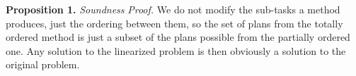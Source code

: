 



\textbf{Proposition 1.} \textit{Soundness}  \newline
\textit{Proof.}
We do not modify the sub-tasks a method produces, just the ordering between them, so the set of plans from the totally ordered method is just a subset of the plans possible from the partially ordered one. Any solution to the linearized problem is then obviously a solution to the original problem.



